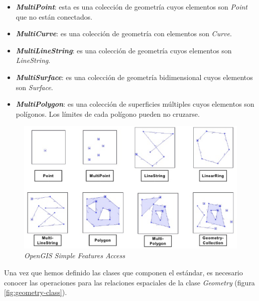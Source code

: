 \begin{itemize}
	\item \textit{\textbf{MultiPoint}}: esta es una colección de geometría cuyos elementos son \textit{Point} que no están conectados.
	
	\item \textit{\textbf{MultiCurve}}: es una colección de geometría con elementos son \textit{Curve}.
	
	\item \textit{\textbf{MultiLineString}}: es una colección de geometría cuyos elementos son \textit{LineString}. 
	
	\item \textit{\textbf{MultiSurface}}: es una colección de geometría bidimensional cuyos elementos son \textit{Surface}.  
	
	\item \textit{\textbf{MultiPolygon}}: es una colección de superficies múltiples cuyos elementos son polígonos. Los límites de cada polígono pueden no cruzarse.
	
\end{itemize}

\begin{figure}[H]
	\centering
	\includegraphics[width=0.9\linewidth]{imagenes/capitulo4/ejemplos}
	\caption{\textit{OpenGIS Simple Features Access} \cite{imagen-ejemplos}}
	\label{fig:ejemplos}
\end{figure}

Una vez que hemos definido las clases que componen el estándar, es necesario conocer las operaciones para las relaciones espaciales de la clase \textit{Geometry} (figura \ref{fig:geometry-class}).


